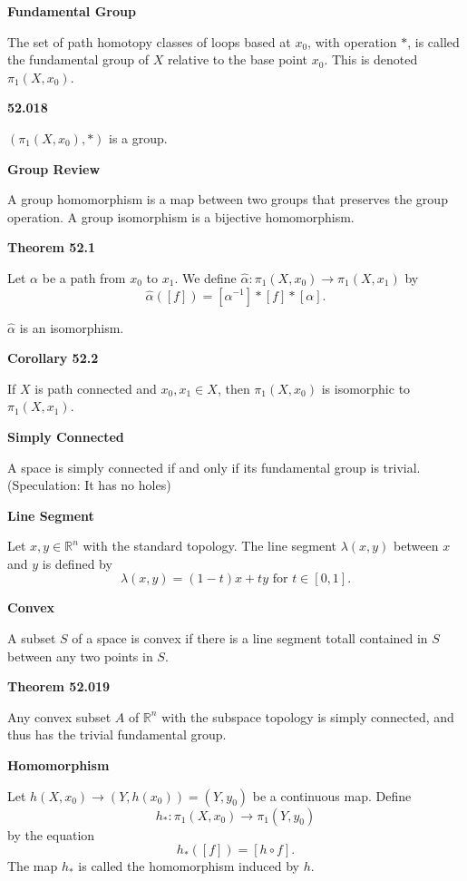 \documentclass{article}
\begin{document}
\medskip\noindent\textbf{Fundamental Group}

    The set of path homotopy classes of loops based at $x_0$, with operation $*$, is called the fundamental group of $X$ relative to the base point $x_0$. This is denoted $\pi_1(X,x_0)$.

\medskip\noindent\textbf{52.018}

    $(\pi_1(X,x_0), *)$ is a group.

\medskip\noindent\textbf{Group Review}

    A group homomorphism is a map between two groups that preserves the group operation.
    A group isomorphism is a bijective homomorphism.

\medskip\noindent\textbf{Theorem 52.1}

    Let $\alpha$ be a path from $x_0$ to $x_1$. We define $\hat\alpha: \pi_1(X,x_0) \to \pi_1(X, x_1)$ by $$\hat\alpha([f]) = [\alpha^{-1}] * [f] * [\alpha].$$

    $\hat\alpha$ is an isomorphism.

\medskip\noindent\textbf{Corollary 52.2}

    If $X$ is path connected and $x_0, x_1 \in X$, then $\pi_1(X, x_0)$ is isomorphic to $\pi_1(X, x_1)$.

\medskip\noindent\textbf{Simply Connected}

    A space is simply connected if and only if its fundamental group is trivial. (Speculation: It has no holes)

\medskip\noindent\textbf{Line Segment}

    Let $x, y \in \mathbb R^n$ with the standard topology.
    The line segment $\lambda(x,y)$ between $x$ and $y$ is defined by $$\lambda(x, y) = (1-t)x+ty \text{ for } t \in [0, 1].$$

\medskip\noindent\textbf{Convex}

    A subset $S$ of a space is convex if there is a line segment totall contained in $S$ between any two points in $S$.

\medskip\noindent\textbf{Theorem 52.019}

    Any convex subset $A$ of $\mathbb R^n$ with the subspace topology is simply connected, and thus has the trivial fundamental group.

\medskip\noindent\textbf{Homomorphism}

    Let $h(X, x_0) \to (Y, h(x_0)) = (Y, y_0)$ be a continuous map.
    Define $$h_*: \pi_1(X, x_0) \to \pi_1(Y, y_0)$$ by the equation $$h_*([f]) = [h \circ f].$$
    The map $h_*$ is called the homomorphism induced by $h$.
\end{document}
